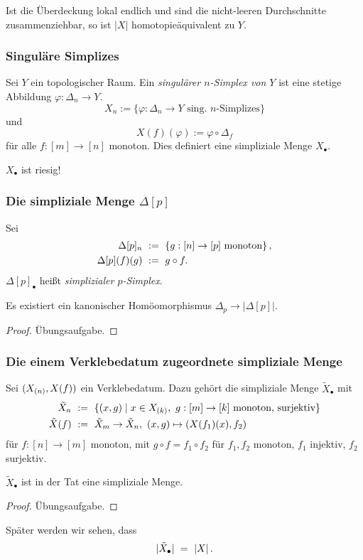 \begin{bemerkung}
  Ist die Überdeckung lokal endlich und sind die nicht-leeren Durchschnitte
  zusammenziehbar, so ist $|X|$ homotopieäquivalent zu $Y$.
\end{bemerkung}


\subsubsection{Singuläre Simplizes}

\begin{definition}
  Sei $Y$ ein topologischer Raum. Ein \emph{singulärer $n$-Simplex von $Y$}
  ist eine stetige Abbildung $\varphi:\Delta_n \to Y$.
  \[ X_n := \{\varphi:\Delta_n \to Y\text{ sing. $n$-Simplizes}\}\]
  und
  \[ X(f)(\varphi) := \varphi\circ \Delta_f\]
  für alle $f:[m] \to [n]$ monoton. Dies definiert eine simpliziale Menge
  $X_\bullet$.
\end{definition}

\begin{bemerkung}
  $X_\bullet$ ist riesig!
\end{bemerkung}

\subsubsection{Die simpliziale Menge $\Delta[p]$}

\begin{definition}
  Sei
  \begin{align*}
    \Delta[p]_n \ &:=\  \{ g: [n]\to [p] \text{ monoton}\}\,, \\
    \Delta[p](f)(g) \ &:=\  g\circ f.
  \end{align*}
  $\Delta[p]_\bullet$ heißt \emph{simplizialer $p$-Simplex}.
\end{definition}

\begin{lemma}
  Es existiert ein kanonischer Homöomorphismus $\Delta_p \to |\Delta[p]|$.
\end{lemma}
\begin{proof}
  Übungsaufgabe.
\end{proof}


\subsubsection{Die einem Verklebedatum zugeordnete simpliziale Menge}

Sei $(X_{(n)}, X(f))$ ein Verklebedatum. Dazu gehört die simpliziale Menge
$\tilde X_\bullet$ mit
\begin{align*}
  \tilde X_n \speq{&:=} \{ (x,g) \mid x\in X\subk k,\ g:[m]\to [k] 
    \text{ monoton, surjektiv}\}\\
  \tilde X(f) \speq{&:=} \tilde X_m \to \tilde X_n,\ 
    (x,g) \mapsto (X(f_1)(x), f_2)
\end{align*}
für $f: [n]\to [m]$ monoton, mit $g\circ f = f_1 \circ f_2$ für
$f_1,f_2$ monoton, $f_1$ injektiv, $f_2$ surjektiv.

\begin{lemma}
  $\tilde X_\bullet$ ist in der Tat eine simpliziale Menge.
\end{lemma}
\begin{proof}
  Übungsaufgabe.
\end{proof}

\begin{bemerkung}
  Später werden wir sehen, dass
  \[ |\tilde X_\bullet| \ =\  |X| \,.\]
\end{bemerkung}

